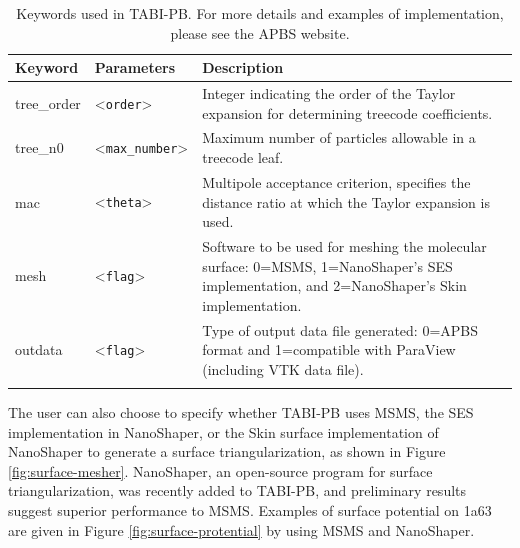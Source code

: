 \documentclass[journal=jpcbfk, manuscript=article]{achemso}
\begin{document}
\begin{table}[!htbp]
	\begin{minipage}{0.99\textwidth}
		\centering
		\caption{\small Keywords used in TABI-PB. For more details and examples of implementation, please see the APBS website. }
		\vspace{1mm}
		
		\newcommand{\param}[1]{\textless\texttt{#1}\textgreater}
		\newcommand\T{\rule{0pt}{0.8ex}}       %
		
		\setlength{\colthree}{8.3cm}
		\setlength{\coltwo}{2.8cm}
		{\small
			\begin{tabular}{ l  l l  }
				\toprule
				{Keyword} & {Parameters} & {Description} \\ \hline
				\T tree\_order & \param{order} & \parbox[t]{\colthree}{Integer indicating the order of the Taylor expansion for determining treecode coefficients.} \\
				\T tree\_n0 & \param{max\_number} & \parbox[t]{\colthree}{Maximum number of particles allowable in a treecode leaf.}\\ 
				\T mac & \param{theta} & \parbox[t]{\colthree}{Multipole acceptance criterion, specifies the distance ratio at which the Taylor expansion is used.}\\ 
				\hline 
				\T mesh & \param{flag} & \parbox[t]{\colthree}{Software to be used for meshing the molecular surface: 0=MSMS, 1=NanoShaper's SES implementation, and 2=NanoShaper's Skin implementation.}  \\
				\hline
				\T outdata & \param{flag} & \parbox[t]{\colthree}{Type of output data file generated: 0=APBS format and 1=compatible with ParaView (including VTK data file).}  \\
				\bottomrule
				\label{tab:TABIPB-keywords}
			\end{tabular}
		} %
	\end{minipage}
\end{table}
%
The user can also choose to specify whether TABI-PB uses MSMS, the SES implementation in NanoShaper, or the Skin surface implementation of NanoShaper to generate a surface triangularization, as shown in Figure \ref{fig:surface-mesher}. NanoShaper, an open-source program for surface triangularization, was recently added to TABI-PB, and preliminary results suggest superior performance to MSMS. Examples of surface potential on 1a63 are given in Figure \ref{fig:surface-protential} by using MSMS and NanoShaper.
\end{document}
